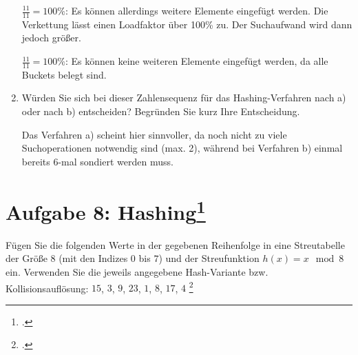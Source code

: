 \documentclass{lehramt-informatik}
\begin{document}
\begin{enumerate}
\begin{antwort}
$\frac{11}{11} = 100\%$: Es können allerdings weitere Elemente eingefügt
werden. Die Verkettung lässt einen Loadfaktor über 100\% zu. Der
Suchaufwand wird dann jedoch größer.


$\frac{11}{11} = 100\%$: Es können keine weiteren Elemente eingefügt
werden, da alle Buckets belegt sind.
\end{antwort}


\item Würden Sie sich bei dieser Zahlensequenz für das Hashing-Verfahren
nach a) oder nach b) entscheiden? Begründen Sie kurz Ihre Entscheidung.

\begin{antwort}
Das Verfahren a) scheint hier sinnvoller, da noch nicht zu viele
Suchoperationen notwendig sind (max. 2), während bei Verfahren b) einmal
bereits 6-mal sondiert werden muss.
\end{antwort}

\end{enumerate}
%

\section{Aufgabe 8: Hashing\footcite[entnommen aus Algorithmen und
Datenstrukturen, Übungsblatt 5, Universität Würzburg]{aud:pu:7}}

Fügen Sie die folgenden Werte in der gegebenen Reihenfolge in eine
Streutabelle der Größe $8$ (mit den Indizes $0$ bis $7$) und der
Streufunktion $h(x) = x \mod 8$ ein. Verwenden Sie die jeweils angegebene
Hash-Variante bzw. Kollisionsauflösung: $15$, $3$, $9$, $23$, $1$, $8$,
$17$, $4$ \footcite[Staatsexamen Theoretische Informatik, Algorithmen
und Datenstrukturen, Realschulen, Herbst 2015, Thema 2, Aufgabe 1
(Auszug)]{examen:46115:2015:09}
\end{document}
